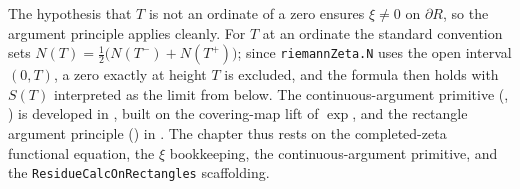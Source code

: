 \begin{remark}
\label{rem:nf_scope}
The hypothesis that $T$ is not an ordinate of a zero ensures $\xi\neq0$ on
$\partial R$, so the argument principle applies cleanly. For $T$ at an ordinate the
standard convention sets $N(T)=\tfrac12\bigl(N(T^-)+N(T^+)\bigr)$; since
\texttt{riemannZeta.N} uses the open interval $(0,T)$, a zero exactly at height $T$
is excluded, and the formula then holds with $S(T)$ interpreted as the limit from
below. The continuous-argument primitive (,
) is developed in , built on the
covering-map lift of $\exp$, and the rectangle argument principle
() in . The chapter thus
rests on the completed-zeta functional equation, the $\xi$ bookkeeping, the
continuous-argument primitive, and the \texttt{ResidueCalcOnRectangles} scaffolding.
\end{remark}
